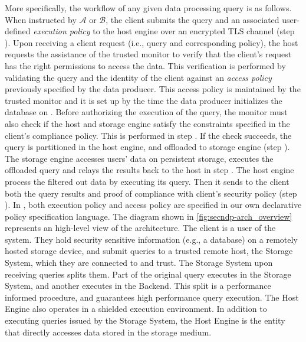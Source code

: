 More specifically, the workflow of any given data processing query is as follows. When instructed by $\mathcal{A}$ or $\mathcal{B}$, the client submits the query and an associated user-defined \textit{execution policy} to the host engine over an encrypted TLS channel (step ). Upon receiving a client request (i.e., query and corresponding policy), the host requests the assistance of the trusted monitor to verify that the client's request has the right permissions to access the data. This verification is performed by validating the query and the identity of the client against an \textit{access policy} previously specified by the data producer. This access policy is maintained by the trusted monitor and it is set up by the time the data producer initializes the database on \project{}. Before authorizing the execution of the query, the monitor must also check if the host and storage engine satisfy the constraints specified in the client's compliance policy. This is performed in step . If the check succeeds, the query is partitioned in the host engine, and offloaded to storage engine (step ). The storage engine accesses users' data on persistent storage, executes the offloaded query and relays the results back to the host in step . The host engine process the filtered out data by executing its query. Then it sends to the client both the query results and proof of compliance with client's security policy (step ). In \project{}, both execution policy and access policy are specified in our own declarative policy specification language.
The diagram shown in \autoref{fig:secndp-arch_overview} represents an high-level view of the \project{} architecture.
The client is a user of the \project{} system.
They hold security sensitive information (e.g., a database) on a remotely hosted storage device, and submit queries to a trusted remote host, the Storage System, which they are connected to and trust.
The Storage System upon receiving queries splits them. 
Part of the original query executes in the Storage System, and another executes in the \project{} Backend.
This split is a performance informed procedure, and guarantees high performance query execution.
The Host Engine also operates in a shielded execution environment. 
In addition to executing queries issued by the Storage System, the Host Engine is the entity that directly accesses data stored in the storage medium.
